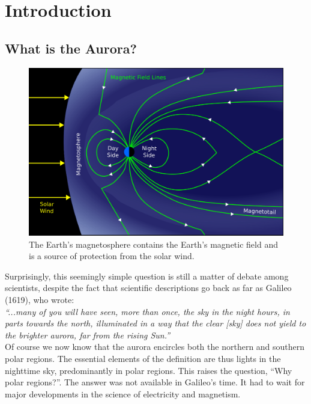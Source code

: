 \documentclass{article}
\newcommand{\contributed}[1]{%
    \par\noindent
    \begingroup
    \setlength{\leftskip}{1em}%
    \itshape
    Contributors: #1
    \par
    \endgroup
    \vspace{0.5em}
}
\begin{document}
\section{Introduction}

\subsection{What is the Aurora?} 


\begin{figure}
  \includegraphics[width=\linewidth]{Fig1_magnetosphere.png}
  \caption{The Earth's magnetosphere contains the Earth's magnetic field and is a source of protection from the solar wind.}
  \label{magnetosphere}
  \label{fig:magnetosphere}
\end{figure}

Surprisingly, this seemingly simple question is still a matter of debate among scientists, despite the fact that scientific descriptions go back as far as Galileo (1619), who wrote:\\

\textit{``...many of you will have seen, more than once, the sky in the night hours, in parts towards the north, illuminated in a way that the clear [sky] does not yield to the brighter aurora, far from the rising Sun.''}\\

Of course we now know that the aurora encircles both the northern and southern polar regions. The essential elements of the definition are thus lights in the nighttime sky, predominantly in polar regions. This raises the question, ``Why polar regions?''. The answer was not available in Galileo's time. It had to wait for major developments in the science of electricity and magnetism. 
\end{document}
